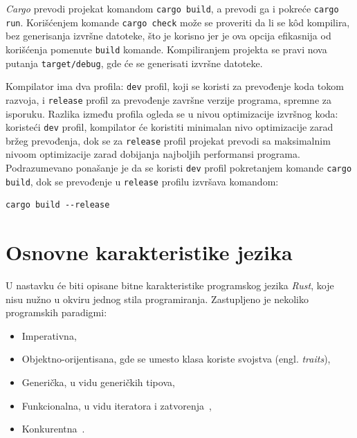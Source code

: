 \documentclass[12pt,oneside]{memoir}
\begin{document}


\emph{Cargo} prevodi projekat komandom
\texttt{cargo build}, a prevodi ga i pokreće
\texttt{cargo run}. Korišćenjem komande \texttt{cargo check}
može se proveriti da li se kôd kompilira, bez generisanja
izvršne datoteke, što je korisno jer je ova opcija efikasnija
od korišćenja pomenute \texttt{build} komande. Kompiliranjem
projekta se pravi nova putanja \texttt{target/debug}, gde će se
generisati izvršne datoteke.

Kompilator ima dva profila: \texttt{dev} profil, koji se koristi za prevođenje koda tokom razvoja, i
\texttt{release} profil za prevođenje završne verzije programa, spremne za isporuku. Razlika između
profila ogleda se u nivou optimizacije izvršnog koda: koristeći \texttt{dev} profil, kompilator
će koristiti minimalan nivo optimizacije zarad bržeg prevođenja, dok se za \texttt{release} profil
projekat prevodi sa maksimalnim nivoom optimizacije zarad dobijanja najboljih performansi
programa. Podrazumevano ponašanje je da se koristi \texttt{dev} profil pokretanjem
komande \texttt{cargo build}, dok se prevođenje u \texttt{release} profilu izvršava komandom:

\begin{lstlisting}[language={}, style=text]
cargo build --release
\end{lstlisting}

\section{Osnovne karakteristike jezika}
U nastavku će biti opisane bitne karakteristike programskog jezika \emph{Rust}, koje nisu nužno
u okviru jednog stila programiranja. Zastupljeno je nekoliko programskih paradigmi:

\begin{itemize}
    \item Imperativna,
    \item Objektno-orijentisana, gde se umesto klasa koriste svojstva (engl. \emph{traits}),
    \item Generička, u vidu generičkih tipova,
    \item Funkcionalna, u vidu iteratora i zatvorenja~\cite{functional_rust},
    \item Konkurentna~\cite{concurrent_rust}.
\end{itemize}
\end{document}
